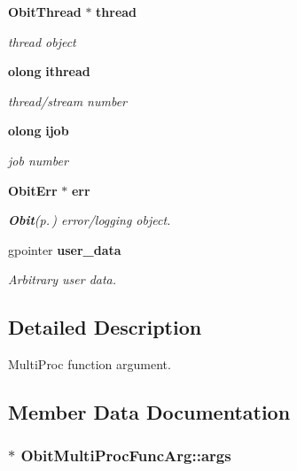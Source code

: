 \begin{CompactItemize}
{\bf Obit\-Thread} $\ast$ {\bf thread}
\begin{CompactList}\small\item\em thread object \item\end{CompactList}\item 
{\bf olong} {\bf ithread}
\begin{CompactList}\small\item\em thread/stream number \item\end{CompactList}\item 
{\bf olong} {\bf ijob}
\begin{CompactList}\small\item\em job number \item\end{CompactList}\item 
{\bf Obit\-Err} $\ast$ {\bf err}
\begin{CompactList}\small\item\em {\bf Obit}{\rm (p.\,\pageref{structObit})} error/logging object. \item\end{CompactList}\item 
gpointer {\bf user\_\-data}
\begin{CompactList}\small\item\em Arbitrary user data. \item\end{CompactList}\end{CompactItemize}


\subsection{Detailed Description}
Multi\-Proc function argument. 



\subsection{Member Data Documentation}
\subsubsection{$\ast$ {\bf Obit\-Multi\-Proc\-Func\-Arg::args}}\label{structObitMultiProcFuncArg_o4}


